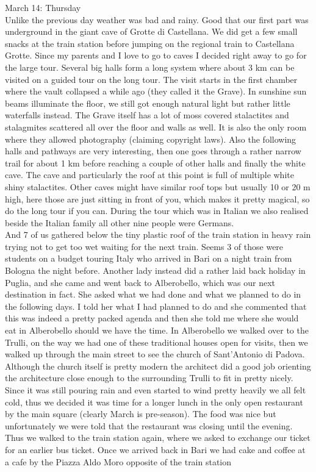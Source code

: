 March 14: Thursday\\
Unlike the previous day weather was bad and rainy. Good that our first part was underground in the giant cave of Grotte di Castellana. We did get a few small snacks at the train station before jumping on the regional train to Castellana Grotte. Since my parents and I love to go to caves I decided right away to go for the large tour. Several big halls form a long system where about 3 km can be visited on a guided tour on the long tour. The visit starts in the first chamber where the vault collapsed a while ago (they called it the Grave). In sunshine sun beams illuminate the floor, we still got enough natural light but rather little waterfalls instead. The Grave itself has a lot of moss covered stalactites and stalagmites scattered all over the floor and walls as well. It is also the only room where they allowed photography (claiming copyright laws). Also the following halls and pathways are very interesting, then one goes through a rather narrow trail for about 1 km before reaching a couple of other halls and finally the white cave. The cave and particularly the roof at this point is full of multiple white shiny stalactites. Other caves might have similar roof tops but usually 10 or 20 m high, here those are just sitting in front of you, which makes it pretty magical, so do the long tour if you can. During the tour which was in Italian we also realised beside the Italian family all other nine people were Germans. \\
And 7 of us gathered below the tiny plastic roof of the train station in heavy rain trying not to get too wet waiting for the next train. Seems 3 of those were students on a budget touring Italy who arrived in Bari on a night train from Bologna the night before. Another lady instead did a rather laid back holiday in Puglia, and she came and went back to Alberobello, which was our next destination in fact. She asked what we had done and what we planned to do in the following days. I told her what I had planned to do and she commented that this was indeed a pretty packed agenda and then she told me where she would eat in Alberobello should we have the time. In Alberobello we walked over to the Trulli, on the way we had one of these traditional houses open for visits, then we walked up through the main street to see the church of Sant'Antonio di Padova. Although the church itself is pretty modern the architect did a good job orienting the architecture close enough to the surrounding Trulli to fit in pretty nicely. Since it was still pouring rain and even started to wind pretty heavily we all felt cold, thus we decided it was time for a longer lunch in the only open restaurant by the main square (clearly March is pre-season). The food was nice but unfortunately we were told that the restaurant was closing until the evening. Thus we walked to the train station again, where we asked to exchange our ticket for an earlier bus ticket. Once we arrived back in Bari we had cake and coffee at a cafe by the Piazza Aldo Moro opposite of the train station\\\


